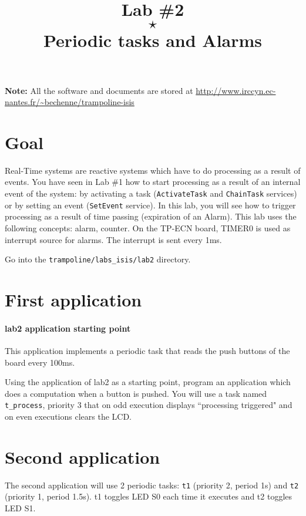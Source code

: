 \documentclass[11pt]{article}
\title{Lab \#2\\$\star$\\Periodic tasks and Alarms}
\author{}
\begin{document}
\maketitle

{\bf Note:} All the software and documents are stored at \url{http://www.irccyn.ec-nantes.fr/~bechenne/trampoline-isis}

\section{Goal}

Real-Time systems are reactive systems which have to do processing as a result of events. You have seen in Lab \#1 how to start processing as a result of an internal event of the system: by activating a task (\texttt{ActivateTask} and \texttt{ChainTask} services) or by setting an event (\texttt{SetEvent} service). In this lab, you will see how to trigger processing as a result of time passing (expiration of an Alarm). This lab uses the following concepts: alarm, counter. On the TP-ECN board, TIMER0 is used as interrupt source for alarms. The interrupt is sent every 1ms.

Go into the \texttt{trampoline/labs_isis/lab2} directory.

\section{First application}

\paragraph{lab2 application starting point} This application implements a periodic task that reads the push buttons of the board every 100ms.

Using the application of lab2 as a starting point, program an application which does a computation when a button is pushed. You will use a task named \texttt{t_process}, priority 3 that on odd execution displays ``processing triggered" and on even executions clears the LCD.

\section{Second application}

The second application will use 2 periodic tasks: \texttt{t1} (priority 2, period 1s) and \texttt{t2} (priority 1, period 1.5s). t1 toggles LED S0 each time it executes and t2 toggles LED S1.
\end{document}
